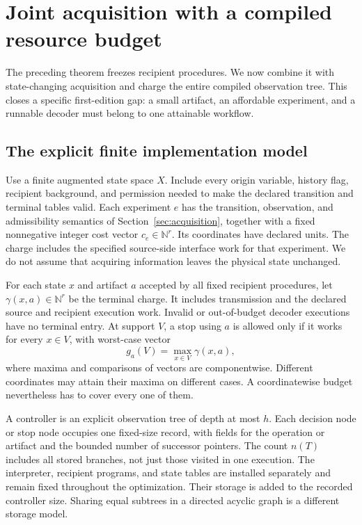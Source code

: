\documentclass[11pt,letterpaper]{article}
\theoremstyle{plain}
\theoremstyle{definition}
\begin{document}
\section{Joint acquisition with a compiled resource budget}\label{sec:budgeted-synthesis}
The preceding theorem freezes recipient procedures. We now combine it with state-changing acquisition and charge the entire compiled observation tree. This closes a specific first-edition gap: a small artifact, an affordable experiment, and a runnable decoder must belong to one attainable workflow.

\subsection{The explicit finite implementation model}
Use a finite augmented state space $X$. Include every origin variable, history flag, recipient background, and permission needed to make the declared transition and terminal tables valid. Each experiment $e$ has the transition, observation, and admissibility semantics of Section~\ref{sec:acquisition}, together with a fixed nonnegative integer cost vector $c_e\in\mathbb N^r$. Its coordinates have declared units. The charge includes the specified source-side interface work for that experiment. We do not assume that acquiring information leaves the physical state unchanged.

For each state $x$ and artifact $a$ accepted by all fixed recipient procedures, let $\gamma(x,a)\in\mathbb N^r$ be the terminal charge. It includes transmission and the declared source and recipient execution work. Invalid or out-of-budget decoder executions have no terminal entry. At support $V$, a stop using $a$ is allowed only if it works for every $x\in V$, with worst-case vector
\[
g_a(V)=\max_{x\in V}\gamma(x,a),
\]
where maxima and comparisons of vectors are componentwise. Different coordinates may attain their maxima on different cases. A coordinatewise budget nevertheless has to cover every one of them.

A controller is an explicit observation tree of depth at most $h$. Each decision node or stop node occupies one fixed-size record, with fields for the operation or artifact and the bounded number of successor pointers. The count $n(T)$ includes all stored branches, not just those visited in one execution. The interpreter, recipient programs, and state tables are installed separately and remain fixed throughout the optimization. Their storage is added to the recorded controller size. Sharing equal subtrees in a directed acyclic graph is a different storage model.
\end{document}
